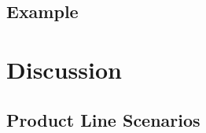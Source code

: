 \documentclass[11pt]{article}
\begin{document}
%
%
%
%
%
%
%
%
%
%
%

\subsection{Example}

\section{Discussion}
%
\subsection{Product Line Scenarios}
%
%
\end{document}
